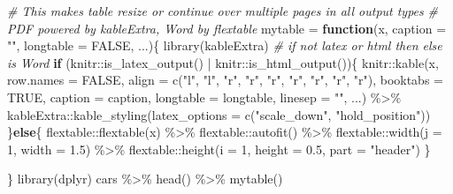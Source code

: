 \documentclass[
]{book}
\newenvironment{Shaded}{\begin{snugshade}}{\end{snugshade}}
\newcommand{\AttributeTok}[1]{\textcolor[rgb]{0.77,0.63,0.00}{#1}}
\newcommand{\CommentTok}[1]{\textcolor[rgb]{0.56,0.35,0.01}{\textit{#1}}}
\newcommand{\ConstantTok}[1]{\textcolor[rgb]{0.00,0.00,0.00}{#1}}
\newcommand{\ControlFlowTok}[1]{\textcolor[rgb]{0.13,0.29,0.53}{\textbf{#1}}}
\newcommand{\DecValTok}[1]{\textcolor[rgb]{0.00,0.00,0.81}{#1}}
\newcommand{\FloatTok}[1]{\textcolor[rgb]{0.00,0.00,0.81}{#1}}
\newcommand{\FunctionTok}[1]{\textcolor[rgb]{0.00,0.00,0.00}{#1}}
\newcommand{\NormalTok}[1]{#1}
\newcommand{\OtherTok}[1]{\textcolor[rgb]{0.56,0.35,0.01}{#1}}
\newcommand{\SpecialCharTok}[1]{\textcolor[rgb]{0.00,0.00,0.00}{#1}}
\newcommand{\StringTok}[1]{\textcolor[rgb]{0.31,0.60,0.02}{#1}}
\begin{document}
\begin{Shaded}
\begin{Highlighting}[]
\CommentTok{\# This makes table resize or continue over multiple pages in all output types}
\CommentTok{\# PDF powered by kableExtra, Word by flextable}
\NormalTok{mytable }\OtherTok{=} \ControlFlowTok{function}\NormalTok{(x, }\AttributeTok{caption =} \StringTok{""}\NormalTok{, }\AttributeTok{longtable =} \ConstantTok{FALSE}\NormalTok{, ...)\{}
  \FunctionTok{library}\NormalTok{(kableExtra)}
  \CommentTok{\# if not latex or html then else is Word}
  \ControlFlowTok{if}\NormalTok{ (knitr}\SpecialCharTok{::}\FunctionTok{is\_latex\_output}\NormalTok{() }\SpecialCharTok{|}\NormalTok{ knitr}\SpecialCharTok{::}\FunctionTok{is\_html\_output}\NormalTok{())\{}
\NormalTok{    knitr}\SpecialCharTok{::}\FunctionTok{kable}\NormalTok{(x, }\AttributeTok{row.names =} \ConstantTok{FALSE}\NormalTok{, }\AttributeTok{align =} \FunctionTok{c}\NormalTok{(}\StringTok{"l"}\NormalTok{, }\StringTok{"l"}\NormalTok{, }\StringTok{"r"}\NormalTok{, }\StringTok{"r"}\NormalTok{, }\StringTok{"r"}\NormalTok{, }\StringTok{"r"}\NormalTok{, }\StringTok{"r"}\NormalTok{, }\StringTok{"r"}\NormalTok{, }\StringTok{"r"}\NormalTok{), }
          \AttributeTok{booktabs =} \ConstantTok{TRUE}\NormalTok{, }\AttributeTok{caption =}\NormalTok{ caption, }\AttributeTok{longtable =}\NormalTok{ longtable,}
          \AttributeTok{linesep =} \StringTok{""}\NormalTok{, ...) }\SpecialCharTok{\%\textgreater{}\%}
\NormalTok{    kableExtra}\SpecialCharTok{::}\FunctionTok{kable\_styling}\NormalTok{(}\AttributeTok{latex\_options =} \FunctionTok{c}\NormalTok{(}\StringTok{"scale\_down"}\NormalTok{, }\StringTok{"hold\_position"}\NormalTok{))}
\NormalTok{  \}}\ControlFlowTok{else}\NormalTok{\{}
\NormalTok{    flextable}\SpecialCharTok{::}\FunctionTok{flextable}\NormalTok{(x) }\SpecialCharTok{\%\textgreater{}\%} 
\NormalTok{      flextable}\SpecialCharTok{::}\FunctionTok{autofit}\NormalTok{() }\SpecialCharTok{\%\textgreater{}\%} 
\NormalTok{      flextable}\SpecialCharTok{::}\FunctionTok{width}\NormalTok{(}\AttributeTok{j =} \DecValTok{1}\NormalTok{, }\AttributeTok{width =} \FloatTok{1.5}\NormalTok{) }\SpecialCharTok{\%\textgreater{}\%} 
\NormalTok{      flextable}\SpecialCharTok{::}\FunctionTok{height}\NormalTok{(}\AttributeTok{i =} \DecValTok{1}\NormalTok{, }\AttributeTok{height =} \FloatTok{0.5}\NormalTok{, }\AttributeTok{part =} \StringTok{"header"}\NormalTok{)}
\NormalTok{  \}}
  
\NormalTok{\}}
\FunctionTok{library}\NormalTok{(dplyr)}
\NormalTok{cars }\SpecialCharTok{\%\textgreater{}\%} 
  \FunctionTok{head}\NormalTok{() }\SpecialCharTok{\%\textgreater{}\%} 
  \FunctionTok{mytable}\NormalTok{()}
\end{Highlighting}
\end{Shaded}
\end{document}
